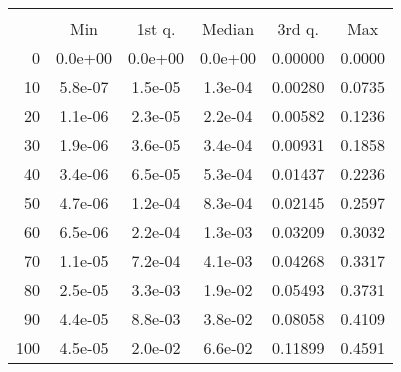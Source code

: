 \begin{tabular}{r|ccccc}
  \multicolumn{6}{c}{{\bf }} \\
  & Min & 1st q. & Median & 3rd q. & Max \\ \hline\hline
  0 & 0.0e+00 & 0.0e+00 & 0.0e+00 & 0.00000 & 0.0000
\\ 10 & 5.8e-07 & 1.5e-05 & 1.3e-04 & 0.00280 & 0.0735
\\ 20 & 1.1e-06 & 2.3e-05 & 2.2e-04 & 0.00582 & 0.1236
\\ 30 & 1.9e-06 & 3.6e-05 & 3.4e-04 & 0.00931 & 0.1858
\\ 40 & 3.4e-06 & 6.5e-05 & 5.3e-04 & 0.01437 & 0.2236
\\ 50 & 4.7e-06 & 1.2e-04 & 8.3e-04 & 0.02145 & 0.2597
\\ 60 & 6.5e-06 & 2.2e-04 & 1.3e-03 & 0.03209 & 0.3032
\\ 70 & 1.1e-05 & 7.2e-04 & 4.1e-03 & 0.04268 & 0.3317
\\ 80 & 2.5e-05 & 3.3e-03 & 1.9e-02 & 0.05493 & 0.3731
\\ 90 & 4.4e-05 & 8.8e-03 & 3.8e-02 & 0.08058 & 0.4109
\\ 100 & 4.5e-05 & 2.0e-02 & 6.6e-02 & 0.11899 & 0.4591
\end{tabular}
